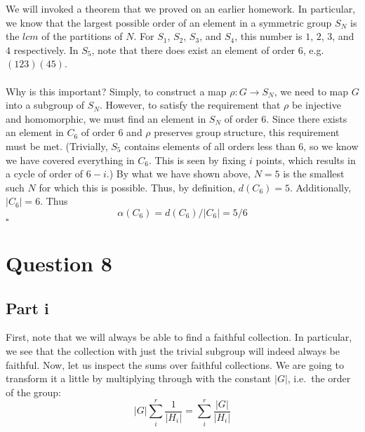\documentclass[letterpaper]{article}
\newcommand*{\QED}{\hfill\ensuremath{\square}}%
\begin{document}
We will invoked a theorem that we proved on an earlier homework.
In particular, we know that the largest possible order of an element in a symmetric group $ S_N $ is the $ lcm $ of the partitions of $ N $.
For $ S_1 $, $ S_2 $, $ S_3 $, and $ S_4 $, this number is $ 1 $, $ 2 $, $ 3 $, and $ 4 $ respectively.
In $ S_5 $, note that there does exist an element of order $ 6 $, e.g.
 $ (123)(45) $.
\\ \\
Why is this important?
Simply, to construct a map $ \rho : G \to S_N $, we need to map $ G $ into a subgroup of $ S_N $.
However, to satisfy the requirement that $ \rho $ be injective and homomorphic, we must find an element in $ S_N $ of order $ 6 $.
Since there exists an element in $ C_6 $ of order $ 6 $ and $ \rho $ preserves group structure, this requirement must be met.
(Trivially, $ S_5 $ contains elements of all orders less than $ 6 $, so we know we have covered everything in $ C_6 $. This is seen by fixing $ i $ points, which results in a cycle of order of $ 6 - i $.)
By what we have shown above, $ N = 5 $ is the smallest such $ N $ for which this is possible.
Thus, by definition, $ d(C_6) = 5 $.
Additionally, $ |C_6| = 6 $.
Thus
\[
\alpha(C_6) = d(C_6) / |C_6| = 5/6
\]
\QED{}

\section{Question 8}
\label{sec:Question8}

\subsection{Part i}
\label{sub:8Parti}

First, note that we will always be able to find a faithful collection.
In particular, we see that the collection with just the trivial subgroup will indeed always be faithful.
Now, let us inspect the sums over faithful collections.
We are going to transform it a little by multiplying through with the constant $ |G| $, i.e.\ the order of the group:
\[
|G| \sum_{i}^{r} \frac{1}{|H_i|} = \sum_{i}^{r} \frac{|G|}{|H_i|}
\]
\end{document}
